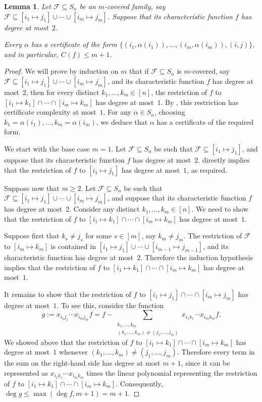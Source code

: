 \documentclass[10pt,a4paper]{amsart}
\newtheorem{lemma}[theorem]{Lemma}
\theoremstyle{definition}
\providecommand{\coset}[2]{[#1 \mapsto #2]}
\begin{document}
\begin{lemma} \label{lem:structure-sym}
Let $\mathcal{F} \subseteq S_n$ be an $m$-covered family, say $\mathcal{F} \subseteq \coset{i_1}{j_1} \cup \cdots \cup \coset{i_m}{j_m}$. Suppose that its characteristic function $f$ has degree at most~$2$.

Every $\alpha$ has a certificate of the form $\{(i_1,\alpha(i_1)),\ldots,(i_m,\alpha(i_m)),(i,j)\}$, and in particular, $C(f) \leq m + 1$.
\end{lemma}
\begin{proof}
We will prove by induction on $m$ that if $\mathcal{F} \subseteq S_n$ is $m$-covered, say $\mathcal{F} \subseteq \coset{i_1}{j_1} \cup \cdots \cup \coset{i_m}{j_m}$, and its characteristic function $f$ has degree at most~$2$, then for every distinct $k_1,\ldots,k_m \in [n]$, the restriction of $f$ to $\coset{i_1}{k_1} \cap \cdots \cap \coset{i_m}{k_m}$ has degree at most~$1$. By , this restriction has certificate complexity at most~$1$. For any $\alpha \in S_n$, choosing $k_1 = \alpha(i_1),\ldots,k_m = \alpha(i_m)$, we deduce that $\alpha$ has a certificate of the required form.

We start with the base case $m = 1$. Let $\mathcal{F} \subseteq S_n$ be such that $\mathcal{F} \subseteq \coset{i_1}{j_1}$, and suppose that its characteristic function $f$ has degree at most~$2$.  directly implies that the restriction of $f$ to $\coset{i_1}{j_1}$ has degree at most~$1$, as required.

Suppose now that $m \geq 2$. Let $\mathcal{F} \subseteq S_n$ be such that $\mathcal{F} \subseteq \coset{i_1}{j_1} \cup \cdots \cup \coset{i_m}{j_m}$, and suppose that its characteristic function $f$ has degree at most~$2$. Consider any distinct $k_1,\ldots,k_m \in [n]$. We need to show that the restriction of $f$ to $\coset{i_1}{k_1} \cap \cdots \cap \coset{i_m}{k_m}$ has degree at most~$1$.

Suppose first that $k_s \neq j_s$ for some $s \in [m]$, say $k_m \neq j_m$. The restriction of $\mathcal{F}$ to $\coset{i_m}{k_m}$ is contained in $\coset{i_1}{j_1} \cup \cdots \cup \coset{i_{m-1}}{j_{m-1}}$, and its characteristic function has degree at most~$2$. Therefore the induction hypothesis implies that the restriction of $f$ to $\coset{i_1}{k_1} \cap \cdots \cap \coset{i_m}{k_m}$ has degree at most~$1$.

It remains to show that the restriction of $f$ to $\coset{i_1}{j_1} \cap \cdots \cap \coset{i_m}{j_m}$ has degree at most~$1$. To see this, consider the function
\[
 g := x_{i_1j_1} \cdots x_{i_mj_m} f = f - \sum_{\substack{k_1,\ldots,k_m \\ (k_1,\ldots,k_m) \neq (j_1,\ldots,j_m)}} x_{i_1k_1} \cdots x_{i_mk_m} f.
\]
We showed above that the restriction of $f$ to $\coset{i_1}{k_1} \cap \cdots \cap \coset{i_m}{k_m}$ has degree at most~$1$ whenever $(k_1,\ldots,k_m) \neq (j_1,\ldots,j_m)$. Therefore every term in the sum on the right-hand side has degree at most $m+1$, since it can be represented as $x_{i_1k_1} \cdots x_{i_mk_m}$ times the linear polynomial representing the restriction of $f$ to $\coset{i_1}{k_1} \cap \cdots \cap \coset{i_m}{k_m}$. Consequently, $\deg g \leq \max(\deg f, m+1) = m+1$.


\end{proof}
\end{document}
